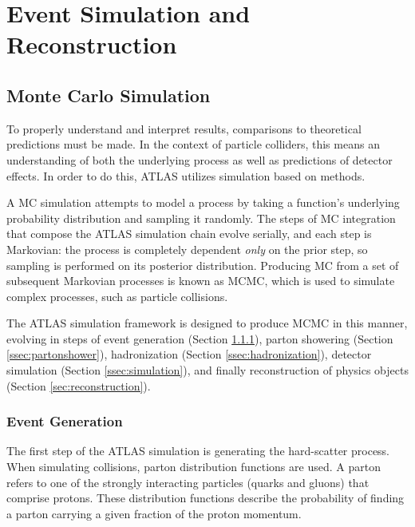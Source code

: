 \chapter{Event Simulation and Reconstruction} \label{ch:eventreco}


\section{Monte Carlo Simulation} \label{sec:simulation}

To properly understand and interpret results, comparisons to theoretical predictions must be made. In the context of particle colliders, this means an understanding of both the underlying process as well as predictions of detector effects. In order to do this, ATLAS utilizes simulation based on  methods. 

A \gls{MC} simulation attempts to model a process by taking a function's underlying probability distribution and sampling it randomly. The steps of \gls{MC} integration that compose the ATLAS simulation chain evolve serially, and each step is Markovian: the process is completely dependent \textit{only} on the prior step, so sampling is performed on its posterior distribution. Producing \gls{MC} from a set of subsequent Markovian processes is known as \gls{MCMC}, which is used to simulate complex processes, such as particle collisions.

The ATLAS simulation framework is designed to produce \gls{MCMC} in this manner, evolving in steps of event generation (Section \ref{ssec:eventgen}), parton showering (Section \ref{ssec:partonshower}), hadronization (Section \ref{ssec:hadronization}), detector simulation (Section \ref{ssec:simulation}), and finally reconstruction of physics objects (Section \ref{sec:reconstruction}).

\subsection{Event Generation} \label{ssec:eventgen}
The first step of the ATLAS simulation is generating the hard-scatter process. When simulating collisions, parton distribution functions are used. A parton refers to one of the strongly interacting particles (quarks and gluons) that comprise protons. These distribution functions describe the probability of finding a parton carrying a given fraction of the proton momentum.

